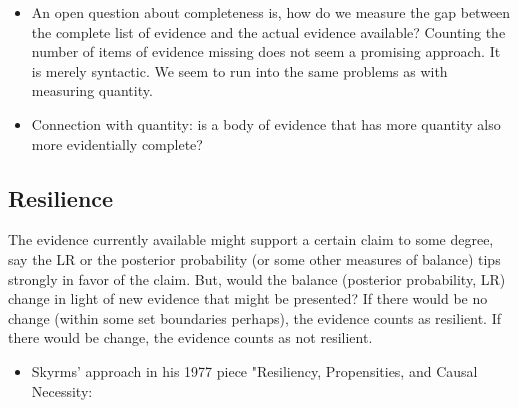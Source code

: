 \documentclass[
  10pt,
  dvipsnames,enabledeprecatedfontcommands]{scrartcl}
\providecommand{\tightlist}{%
  \setlength{\itemsep}{0pt}\setlength{\parskip}{0pt}}
\begin{document}
\begin{itemize}
\tightlist
\item
  An open question about completeness is, how do we measure the gap
  between the complete list of evidence and the actual evidence
  available? Counting the number of items of evidence missing does not
  seem a promising approach. It is merely syntactic. We seem to run into
  the same problems as with measuring quantity.
\end{itemize}


\begin{itemize}
\tightlist
\item
  Connection with quantity: is a body of evidence that has more quantity
  also more evidentially complete?
\end{itemize}


\hypertarget{resilience}{%
\subsection{Resilience}\label{resilience}}

The evidence currently available might support a certain claim to some
degree, say the LR or the posterior probability (or some other measures
of balance) tips strongly in favor of the claim. But, would the balance
(posterior probability, LR) change in light of new evidence that might
be presented? If there would be no change (within some set boundaries
perhaps), the evidence counts as resilient. If there would be change,
the evidence counts as not resilient.

\begin{itemize}
\tightlist
\item
  Skyrms' approach in his 1977 piece "Resiliency, Propensities, and
  Causal Necessity:
\end{itemize}
\end{document}
